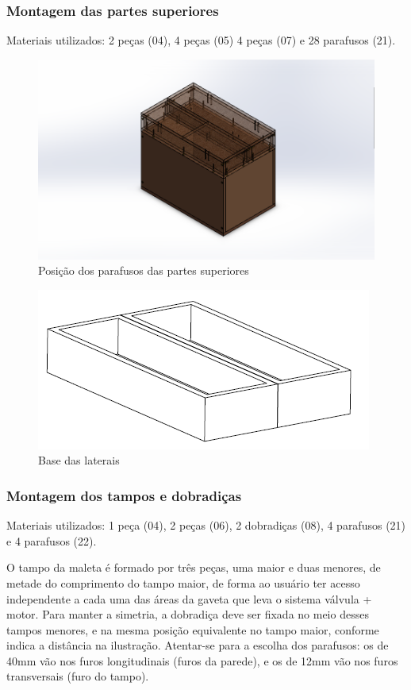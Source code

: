 \subsubsection{Montagem das partes superiores}

Materiais utilizados: 2 peças (04), 4 peças (05) 4 peças (07) e 28 parafusos (21).

\begin{figure} [H]
    \centering
    \includegraphics[width=.7\textwidth]{Figuras/montagemMaletasEstrutura/alimentacaoGavetas.png}
    \caption{Posição dos parafusos das partes superiores}
    \label{fig:alimentacaoGavetas}
\end{figure}

\begin{figure} [H]
    \centering
    \includegraphics[width=.5\textwidth]{Figuras/suporte/laterais.png}
    \caption{Base das laterais}
\end{figure}

\subsubsection{Montagem dos tampos e dobradiças}

Materiais utilizados: 1 peça (04), 2 peças (06), 2 dobradiças (08), 4 parafusos (21) e 4 parafusos (22).
\par O tampo da maleta é formado por três peças, uma maior e duas menores, de metade do comprimento do tampo maior, de forma ao usuário ter acesso independente a cada uma das áreas da gaveta que leva o sistema válvula + motor. Para manter a simetria, a dobradiça deve ser fixada no meio desses tampos menores, e na mesma posição equivalente no tampo maior, conforme indica a distância na ilustração. Atentar-se para a escolha dos parafusos: os de 40mm vão nos furos longitudinais (furos da parede), e os de 12mm vão nos furos transversais (furo do tampo). 

